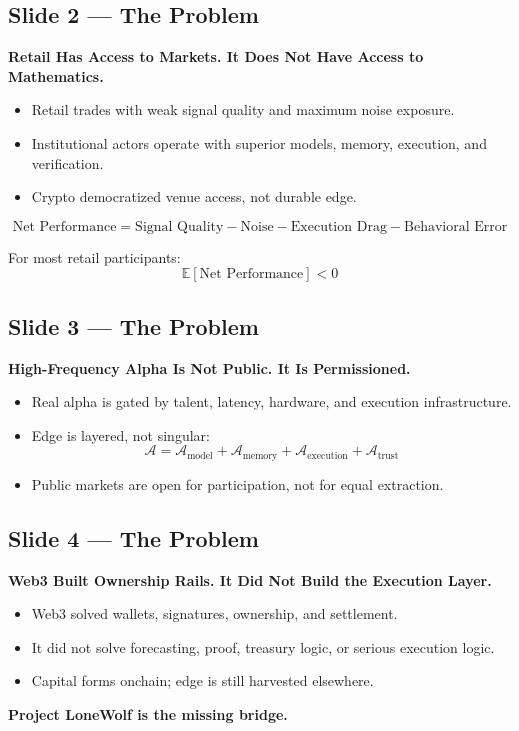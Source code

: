 \documentclass[11pt]{article}
\newcommand{\decktitle}[1]{
  \vspace{0.5em}
  {\Large\bfseries\color{wolfred} #1}
  \vspace{0.5em}
}
\begin{document}
\subsection*{Slide 2 --- The Problem}
\begin{slidebox}
\decktitle{Retail Has Access to Markets. It Does Not Have Access to Mathematics.}
\begin{itemize}[leftmargin=1.5em]
  \item Retail trades with weak signal quality and maximum noise exposure.
  \item Institutional actors operate with superior models, memory, execution, and verification.
  \item Crypto democratized venue access, not durable edge.
\end{itemize}

\[
\text{Net Performance} = \text{Signal Quality} - \text{Noise} - \text{Execution Drag} - \text{Behavioral Error}
\]

For most retail participants:
\[
\mathbb{E}[\text{Net Performance}] < 0
\]
\end{slidebox}

\subsection*{Slide 3 --- The Problem}
\begin{slidebox}
\decktitle{High-Frequency Alpha Is Not Public. It Is Permissioned.}
\begin{itemize}[leftmargin=1.5em]
  \item Real alpha is gated by talent, latency, hardware, and execution infrastructure.
  \item Edge is layered, not singular:
\[
\mathcal{A} = \mathcal{A}_{\text{model}} + \mathcal{A}_{\text{memory}} + \mathcal{A}_{\text{execution}} + \mathcal{A}_{\text{trust}}
\]
  \item Public markets are open for participation, not for equal extraction.
\end{itemize}
\end{slidebox}

\subsection*{Slide 4 --- The Problem}
\begin{slidebox}
\decktitle{Web3 Built Ownership Rails. It Did Not Build the Execution Layer.}
\begin{itemize}[leftmargin=1.5em]
  \item Web3 solved wallets, signatures, ownership, and settlement.
  \item It did not solve forecasting, proof, treasury logic, or serious execution logic.
  \item Capital forms onchain; edge is still harvested elsewhere.
\end{itemize}

\textbf{Project LoneWolf is the missing bridge.}
\end{slidebox}
\end{document}
